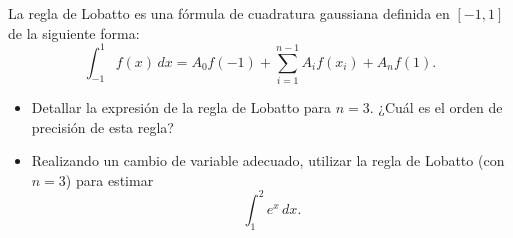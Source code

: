 \begin{EjerciciosPropuestos}
  \begin{problema}
    La regla de Lobatto es una fórmula de cuadratura gaussiana
    definida en $[-1,1]$ de la siguiente forma:
    \begin{equation*}
      \int_{-1}^1 f(x)\, dx = A_0 f(-1) + \sum_{i=1}^{n-1} A_if(x_i) +
      A_nf(1).
    \end{equation*}
    \begin{itemize}
    \item Detallar la expresión de la regla de Lobatto para
      $n=3$. ¿Cuál es el orden de precisión de esta regla?
    \item Realizando un cambio de variable adecuado, utilizar la regla
      de Lobatto (con $n=3$) para estimar
      \begin{equation*}
        \int_1^2 e^x\, dx.
      \end{equation*}
    \end{itemize}
  \end{problema}
\end{EjerciciosPropuestos}





